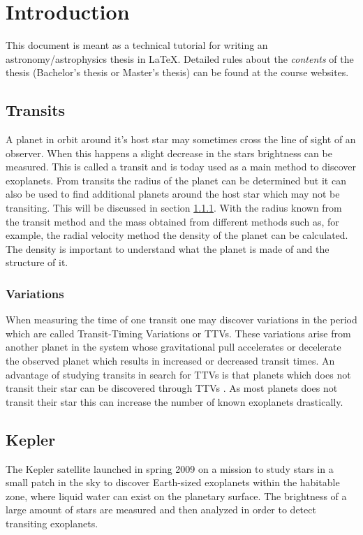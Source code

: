 \documentclass[12pt]{report}
\begin{document}
\chapter{Introduction}

This document is meant as a technical tutorial for writing an
astronomy/astrophysics thesis in LaTeX. Detailed rules about the {\it contents}
of the thesis (Bachelor's thesis or Master's thesis) can be found at the course
websites.

\section{Transits}
	A planet in orbit around it's host star may sometimes cross the line of sight of an observer. When this happens a slight decrease in the stars brightness can be measured. This is called a transit and is today used as a main method to discover exoplanets. From transits the radius of the planet can be determined but it can also be used to find additional planets around the host star which may not be transiting. This will be discussed in section \ref{sec:trans_vari}. With the radius known from the transit method and the mass obtained from different methods such as, for example, the radial velocity method the density of the planet can be calculated. The density is important to understand what the planet is made of and the structure of it.

\subsection{Variations}
\label{sec:trans_vari}

	When measuring the time of one transit one may discover variations in the period which are called Transit-Timing Variations or TTVs. These variations arise from another planet in the system whose gravitational pull accelerates or decelerate the observed planet which results in increased or decreased transit times. An advantage of studying transits in search for TTVs is that planets which does not transit their star can be discovered through TTVs \citep{0004-637X-777-1-3}. As most planets does not transit their star this can increase the number of known exoplanets drastically.

\section{Kepler}
	The Kepler satellite launched in spring 2009 on a mission to study stars in a small patch in the sky to discover Earth-sized exoplanets within the habitable zone, where liquid water can exist on the planetary surface. The brightness of a large amount of stars are measured and then analyzed in order to detect transiting exoplanets.
	
\end{document}
